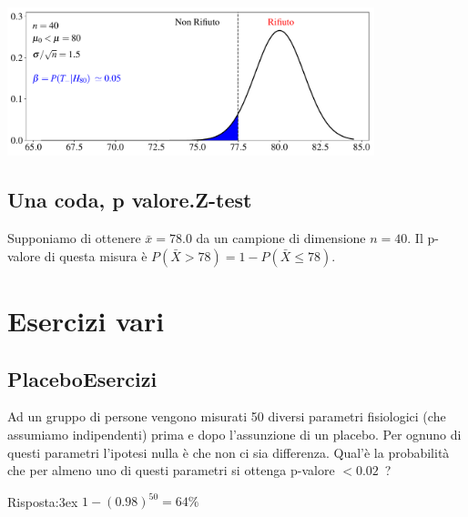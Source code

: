 \documentclass[12pt,openany]{book}
\theoremstyle{mio}
\theoremstyle{liscio}
\begin{document}
\hfil\includegraphics[width=0.8\textwidth]{figure/Z-test_04.pdf}





\clearpage\subsection{Una coda, p valore.\hfill Z-test}


Supponiamo di ottenere $\bar x=78.0$ da un campione di dimensione $n=40$. Il p-valore di questa misura è $P(\bar X>78)=1-P(\bar X\le 78)$.





\clearpage\section{Esercizi vari}
\subsection{Placebo\hfill Esercizi}


Ad un gruppo di persone vengono misurati 50 diversi parametri fisiologici (che assumiamo indipendenti) prima e dopo l'assunzione di un placebo. Per ognuno di questi parametri l'ipotesi nulla è che non ci sia differenza. Qual'è la probabilità che per almeno uno di questi parametri si ottenga p-valore $<0.02$~?


Risposta:\kern3ex $1-(0.98)^{50}=64\%$
\end{document}
